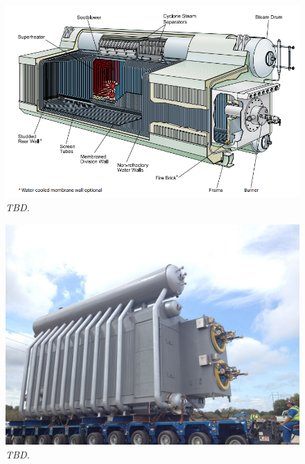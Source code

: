 \begin{figure}[ht]
    \centerline{\includegraphics[scale=0.6]{b_w_boiler_03.png}}
    \caption{\textit{TBD.}}
    \label{im:b_w_boiler_03}
\end{figure}


\begin{figure}[ht]
    \centerline{\includegraphics[scale=0.4]{b_w_boiler_04.jpg}}
    \caption{\textit{TBD.}}
    \label{im:b_w_boiler_04}
\end{figure}

